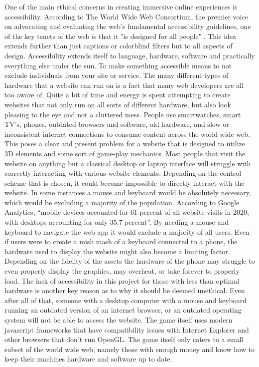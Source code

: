 \documentclass[10pt,twocolumn]{article}
\begin{document}
One of the main ethical concerns in creating immersive online experiences is accessibility. According to The World Wide Web Consortium, the premier voice on advocating and evaluating the web’s fundamental accessibility guidelines, one of the key tenets of the web is that it "is designed for all people" \cite{WebAccess}. This idea extends further than just captions or colorblind filters but to all aspects of design. Accessibility extends itself to language, hardware, software and practically everything else under the sun. To make something accessible means to not exclude individuals from your site or service.
The many different types of hardware that a website can run on is a fact that many web developers are all too aware of. Quite a bit of time and energy is spent attempting to create websites that not only run on all sorts of different hardware, but also look pleasing to the eye and not a cluttered mess. People use smartwatches, smart TV’s, phones, outdated browsers and software, old hardware, and slow or inconsistent internet connections to consume content across the world wide web. 
This poses a clear and present problem for a website that is designed to utilize 3D elements and some sort of game-play mechanics. Most people that visit the website on anything but a classical desktop or laptop interface will struggle with correctly interacting with various website elements. Depending on the control scheme that is chosen, it could become impossible to directly interact with the website. In some instances a mouse and keyboard would be absolutely necessary, which would be excluding a majority of the population. According to Google Analytics, “mobile devices accounted for 61 percent of all website visits in 2020, with desktops accounting for only 35.7 percent”\cite{MobileVsDesktop}. By needing a mouse and keyboard to navigate the web app it would exclude a majority of all users. Even if users were to create a mish mash of a keyboard connected to a phone, the hardware used to display the website might also become a limiting factor. Depending on the fidelity of the assets the hardware of the phone may struggle to even properly display the graphics, may overheat, or take forever to properly load. The lack of accessibility in this project for those with less than optimal hardware is another key reason as to why it should be deemed unethical. Even after all of that, someone with a desktop computer with a mouse and keyboard running an outdated version of an internet browser, or an outdated operating system will not be able to access the website. The game itself uses modern javascript frameworks that have compatibility issues with Internet Explorer and other browsers that don’t run OpenGL. The game itself only caters to a small subset of the world wide web, namely those with enough money and know how to keep their machines hardware and software up to date.
\end{document}
